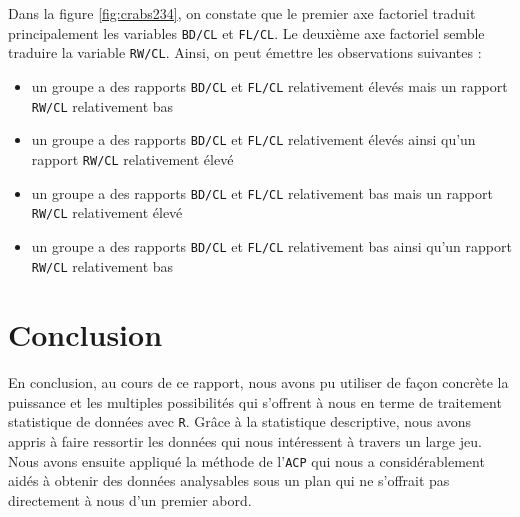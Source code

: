 \documentclass{article}
\begin{document}
\begin{multicols}{2}
Dans la figure \ref{fig:crabs234}, on constate que le premier axe factoriel traduit principalement les variables \texttt{BD/CL} et \texttt{FL/CL}. Le deuxième axe factoriel semble traduire la variable \texttt{RW/CL}. Ainsi, on peut émettre les observations suivantes :
\begin{itemize}
  \item un groupe a des rapports \texttt{BD/CL} et \texttt{FL/CL} relativement élevés mais un rapport \texttt{RW/CL} relativement bas 
  \item un groupe a des rapports \texttt{BD/CL} et \texttt{FL/CL} relativement élevés ainsi qu'un rapport \texttt{RW/CL} relativement élevé 
  \item un groupe a des rapports \texttt{BD/CL} et \texttt{FL/CL} relativement bas mais un rapport \texttt{RW/CL} relativement élevé 
  \item un groupe a des rapports \texttt{BD/CL} et \texttt{FL/CL} relativement bas ainsi qu'un rapport \texttt{RW/CL} relativement bas 
\end{itemize}

\section{Conclusion}

En conclusion, au cours de ce rapport, nous avons pu utiliser de façon concrète la puissance et les multiples possibilités qui s’offrent à nous en terme de traitement statistique de données avec \texttt{R}. Grâce à la statistique descriptive, nous avons appris à faire ressortir les données qui nous intéressent à travers un large jeu. Nous avons ensuite appliqué la méthode de l’\texttt{ACP} qui nous a considérablement aidés à obtenir des données analysables sous un plan qui ne s’offrait pas directement à nous d'un premier abord.

\end{multicols}
\end{document}

